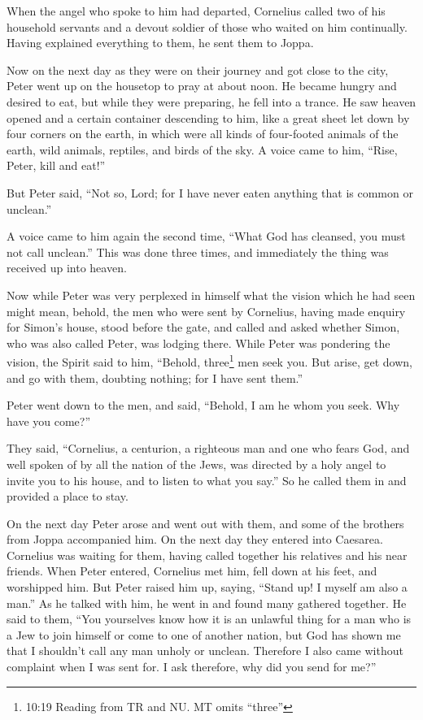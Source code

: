  When the angel who spoke to him had departed, Cornelius
called two of his household servants and a devout soldier of those who
waited on him continually.  Having explained everything to
them, he sent them to Joppa.

 Now on the next day as they were on their journey and got
close to the city, Peter went up on the housetop to pray at about noon.
 He became hungry and desired to eat, but while they were
preparing, he fell into a trance.  He saw heaven opened and
a certain container descending to him, like a great sheet let down by
four corners on the earth,  in which were all kinds of
four-footed animals of the earth, wild animals, reptiles, and birds of
the sky.  A voice came to him, ``Rise, Peter, kill and
eat!''

 But Peter said, ``Not so, Lord; for I have never eaten
anything that is common or unclean.''

 A voice came to him again the second time, ``What God has
cleansed, you must not call unclean.''  This was done three
times, and immediately the thing was received up into heaven.

 Now while Peter was very perplexed in himself what the
vision which he had seen might mean, behold, the men who were sent by
Cornelius, having made enquiry for Simon's house, stood before the gate,
 and called and asked whether Simon, who was also called
Peter, was lodging there.  While Peter was pondering the
vision, the Spirit said to him, ``Behold, three\footnote{10:19 Reading
  from TR and NU. MT omits ``three''} men seek you.  But
arise, get down, and go with them, doubting nothing; for I have sent
them.''

 Peter went down to the men, and said, ``Behold, I am he
whom you seek. Why have you come?''

 They said, ``Cornelius, a centurion, a righteous man and
one who fears God, and well spoken of by all the nation of the Jews, was
directed by a holy angel to invite you to his house, and to listen to
what you say.''  So he called them in and provided a place
to stay.

On the next day Peter arose and went out with them, and some of the
brothers from Joppa accompanied him.  On the next day they
entered into Caesarea. Cornelius was waiting for them, having called
together his relatives and his near friends.  When Peter
entered, Cornelius met him, fell down at his feet, and worshipped him.
 But Peter raised him up, saying, ``Stand up! I myself am
also a man.''  As he talked with him, he went in and found
many gathered together.  He said to them, ``You yourselves
know how it is an unlawful thing for a man who is a Jew to join himself
or come to one of another nation, but God has shown me that I shouldn't
call any man unholy or unclean.  Therefore I also came
without complaint when I was sent for. I ask therefore, why did you send
for me?''

